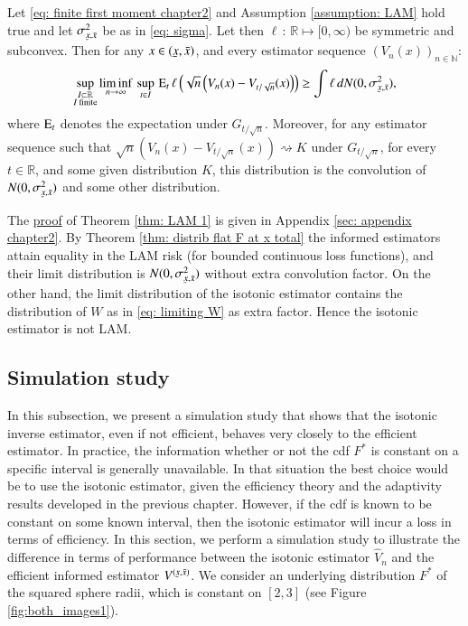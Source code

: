 \begin{theorem}\label{thm: LAM 1}
    Let \eqref{eq: finite first moment chapter2} and Assumption \ref{assumption: LAM} hold true and let $\sigma^2_{\ubar{x},\bar{x}}$ be as in \eqref{eq: sigma}. Let then $\ell \, : \, \mathbb{R} \mapsto [0,\infty)$ be symmetric and subconvex. Then for any $x \in (\ubar{x},\bar{x})$, and every estimator sequence $\left( V_n(x)\right)_{n \in \mathbb{N}}$:
    \begin{align}\label{eq: LAM 1}
    \sup_{\substack{I \subset \mathbb{R} \\ I \: \textup{finite}}} \liminf_{n \rightarrow \infty} \, \sup_{t \in I} \, \ex_t \, \ell\left(\sqrt{n}\left(V_n(x)- V_{t/\sqrt{n}}(x)\right)\right) \geq \int \ell \, d N (0, \sigma^2_{\ubar{x},\bar{x}}),
    \end{align}
    where $\mathrm{E}_t$ denotes the expectation under $G_{\scriptscriptstyle{t/\sqrt{n}}}$. Moreover, for any estimator sequence such that $\sqrt{n}\left(V_n(x)- V_{t/\sqrt{n}}(x)\right) \rightsquigarrow K$ under $G_{\scriptscriptstyle{t/\sqrt{n}}}$, for every $t \in \mathbb{R}$, and some given distribution $K$, this distribution is the convolution of $N (0, \sigma^2_{\ubar{x},\bar{x}})$ and some other distribution.
\end{theorem}
 
The \hyperlink{Proof of LAM thm}{proof} of Theorem \ref{thm: LAM 1} is given in Appendix \ref{sec: appendix chapter2}. By Theorem \ref{thm: distrib flat F at x total} the informed estimators attain equality in the LAM risk (for bounded continuous loss functions), and their limit distribution is $N (0, \sigma^2_{\ubar{x},\bar{x}})$ without extra convolution factor. On the other hand, the limit distribution of the isotonic estimator contains the distribution of $W$ as in \eqref{eq: limiting W} as extra factor. Hence the isotonic estimator is not LAM.

\subsection{Simulation study}\label{sec:simulation study}

In this subsection, we present a simulation study that shows that the isotonic inverse estimator, even if not efficient, behaves very closely to the efficient estimator. In practice, the information whether or not the cdf $F^*$ is constant on a specific interval is generally unavailable. In that situation the best choice would be to use the isotonic estimator, given the efficiency theory and the adaptivity results developed in the previous chapter. However, if the cdf is known to be constant on some known interval, then the isotonic estimator will incur a loss in terms of efficiency. In this section, we perform a simulation study to illustrate the difference in terms of performance between the isotonic estimator $\hat{V}_n$ and the efficient informed estimator $V^{(\ubar{x},\bar{x})}$. We consider an underlying distribution $F^*$ of the squared sphere radii, which is constant on $[2,3]$ (see Figure \ref{fig:both_images1}).

